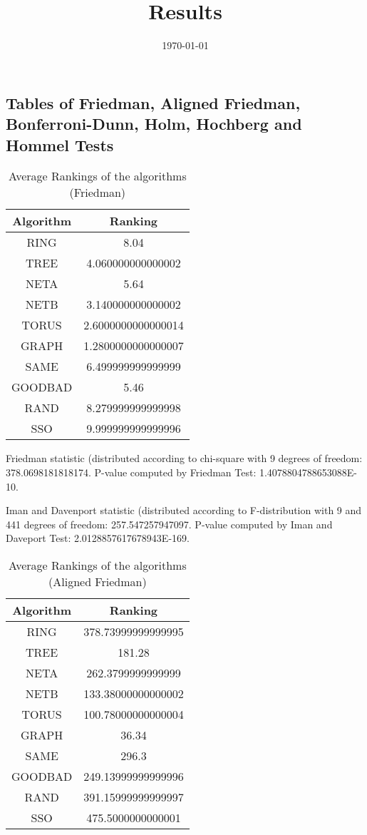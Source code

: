 \documentclass[a4paper,10pt]{article}
\title{Results}
\author{}
\date{\today}
\begin{document}
\begin{landscape}
\oddsidemargin 0in \topmargin 0in\maketitle
\section{Tables of Friedman, Aligned Friedman, Bonferroni-Dunn, Holm, Hochberg and Hommel Tests}
\begin{table}[!htp]
\centering
\caption{Average Rankings of the algorithms (Friedman)
}\begin{tabular}{c|c}
Algorithm&Ranking\\
\hline
 RING&8.04\\
 TREE&4.060000000000002\\
 NETA&5.64\\
 NETB&3.140000000000002\\
 TORUS&2.6000000000000014\\
 GRAPH&1.2800000000000007\\
 SAME&6.499999999999999\\
 GOODBAD&5.46\\
 RAND&8.279999999999998\\
 SSO&9.999999999999996\\
\end{tabular}
\end{table}


Friedman statistic (distributed according to chi-square with 9 degrees of freedom: 378.0698181818174. 
P-value computed by Friedman Test: 1.4078804788653088E-10.\newline

Iman and Davenport statistic (distributed according to F-distribution with 9 and 441 degrees of freedom: 257.547257947097. 
P-value computed by Iman and Daveport Test: 2.0128857617678943E-169.\newline


\newpage

\begin{table}[!htp]
\centering
\caption{Average Rankings of the algorithms (Aligned Friedman)
}\begin{tabular}{c|c}
Algorithm&Ranking\\
\hline
 RING&378.73999999999995\\
 TREE&181.28\\
 NETA&262.3799999999999\\
 NETB&133.38000000000002\\
 TORUS&100.78000000000004\\
 GRAPH&36.34\\
 SAME&296.3\\
 GOODBAD&249.13999999999996\\
 RAND&391.15999999999997\\
 SSO&475.5000000000001\\
\end{tabular}
\end{table}



\end{landscape}
\end{document}
